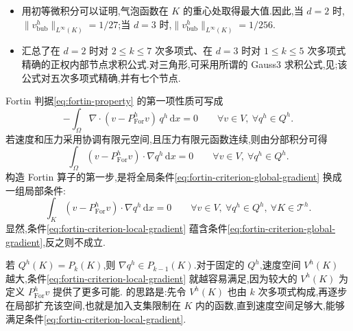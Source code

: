 \begin{note}[关于气泡函数]\label{note:bubble-function-quadrature}
\begin{itemize}
\item 用初等微积分可以证明,气泡函数在 $K$ 的重心处取得最大值.因此,当 $d=2$ 时,$\|v_{\mathrm{bub}}^h\|_{L^\infty(K)}=1/27$;当 $d=3$ 时,$\|v_{\mathrm{bub}}^h\|_{L^\infty(K)}=1/256$.
\item \textcite{CoolsRabinowitz1993} 汇总了在 $d=2$ 时对 $2\le k\le7$ 次多项式、在 $d=3$ 时对 $1\le k\le5$ 次多项式精确的正权内部节点求积公式.对三角形,可采用所谓的 Gauss3 求积公式,见\textcite{Stroud1971};该公式对五次多项式精确,并有七个节点.
\end{itemize}
\end{note}

\begin{note}\label{note:fortin-criterion-generalization}
Fortin 判据\cref{eq:fortin-property} 的第一项性质可写成
\[
  -\int_\Omega \nabla\cdot(v-P_{\mathrm{For}}^h v)\,q^h\,\mathrm{d}x=0
  \qquad\forall v\in V,\ \forall q^h\in Q^h.
\]
若速度和压力采用协调有限元空间,且压力有限元函数连续,则由分部积分可得
\begin{equation}\label{eq:fortin-criterion-global-gradient}
  \int_\Omega (v-P_{\mathrm{For}}^h v)\cdot\nabla q^h\,\mathrm{d}x=0
  \qquad\forall v\in V,\ \forall q^h\in Q^h.
\end{equation}
构造 Fortin 算子的第一步,是将全局条件\cref{eq:fortin-criterion-global-gradient} 换成一组局部条件:
\begin{equation}\label{eq:fortin-criterion-local-gradient}
  \int_K (v-P_{\mathrm{For}}^h v)\cdot\nabla q^h\,\mathrm{d}x=0
  \qquad\forall v\in V,\ \forall q^h\in Q^h,\ \forall K\in\mathcal{T}^h.
\end{equation}
显然,条件\cref{eq:fortin-criterion-local-gradient} 蕴含条件\cref{eq:fortin-criterion-global-gradient},反之则不成立.
\end{note}

\begin{note}[扩充速度空间]\label{note:enrich-velocity-space}
若 $Q^h(K)=P_k(K)$,则 $\nabla q^h\in P_{k-1}(K)$.对于固定的 $Q^h$,速度空间 $V^h(K)$ 越大,条件\cref{eq:fortin-criterion-local-gradient} 就越容易满足,因为较大的 $V^h(K)$ 为定义 $P_{\mathrm{For}}^h v$ 提供了更多可能.\textcite{ArnoldBrezziFortin1984} 的思路是:先令 $V^h(K)$ 也由 $k$ 次多项式构成,再逐步在局部扩充该空间,也就是加入支集限制在 $K$ 内的函数,直到速度空间足够大,能够满足条件\cref{eq:fortin-criterion-local-gradient}.
\end{note}

